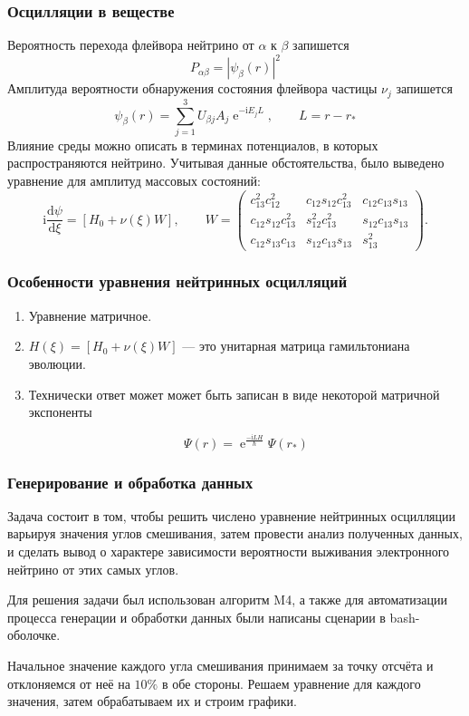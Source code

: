 \documentclass[utf8,9pt,mathserif,usepdftitle=false]{beamer}
\newcommand{\dd}{\mathrm{d}}
\renewcommand{\exp}{\operatorname{e}}
\renewcommand{\imath}{\mathrm{i}}
\begin{document}
\begin{frame}
	\frametitle{Осцилляции в веществе}
	Вероятность перехода флейвора нейтрино от \(\alpha\) к \(\beta\) запишется
	\begin{equation}
		P_{\alpha \beta}=|\psi_{\beta}(r)|^{2}
	\end{equation}
	\onslide<2->%
	Амплитуда вероятности обнаружения состояния флейвора частицы \(\nu_{j}\) запишется
	\begin{equation}
		\psi_{\beta}(r)=\sum_{j=1}^{3}U_{\beta j}A_{j}\exp^{-\imath E_{j}L}, \qquad L=r-r_{*}
	\end{equation}
	Влияние среды можно описать в терминах потенциалов, в которых
	распространяются нейтрино. Учитывая данные обстоятельства, было выведено
	уравнение для амплитуд массовых состояний:
	\begin{equation}\label{eq:2}
		\imath\frac{\dd\psi}{\dd\xi}=[H_{0}+\nu(\xi)W], 
		\qquad
		 W=
		\begin{pmatrix}
			c_{13}^{2}c_{12}^{2} & c_{12}s_{12}c_{13}^{2} & c_{12}c_{13}s_{13}\\
			c_{12}s_{12}c_{13}^{2} & s_{12}^{2}c_{13}^{2} & s_{12}c_{13}s_{13}\\
			c_{12}s_{13}c_{13} & s_{12}c_{13}s_{13} & s_{13}^{2}
		\end{pmatrix}.
	\end{equation}
\end{frame}

\begin{frame}
	\frametitle{Особенности уравнения нейтринных осцилляций}%
  \begin{enumerate}
  \item<1-> Уравнение матричное.
  \item<2-> \(H(\xi)=[H_{0}+\nu(\xi)W]\) — это унитарная матрица гамильтониана
    эволюции.
  \item<3-> Технически ответ может может быть записан в виде некоторой матричной
    экспоненты
    
    \begin{equation}
    	\Psi(r)=\exp^{\frac{-\imath LH}{\hbar}}\Psi(r_{*})
    \end{equation}
  \end{enumerate}
\end{frame}

\begin{frame}
	\frametitle{Генерирование и обработка данных}%
	Задача состоит в том, чтобы решить числено уравнение нейтринных осцилляции варьируя 
	значения углов смешивания, затем провести анализ полученных данных, и сделать вывод 
	о характере зависимости вероятности выживания электронного нейтрино от этих самых 
	углов.
	
	Для решения задачи был использован алгоритм M4, а также для автоматизации процесса 
	генерации и обработки данных были написаны сценарии в bash-оболочке.
  
  Начальное значение каждого угла смешивания принимаем за точку отсчёта и
  отклоняемся от неё на \(10\%\) в обе стороны. Решаем уравнение для каждого
  значения, затем обрабатываем их и строим графики.
\end{frame}
\end{document}
